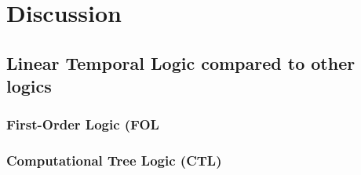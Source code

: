 \section{Discussion}
\subsection{Linear Temporal Logic compared to other logics}
\subsubsection{First-Order Logic (FOL}
\subsubsection{Computational Tree Logic (CTL)}